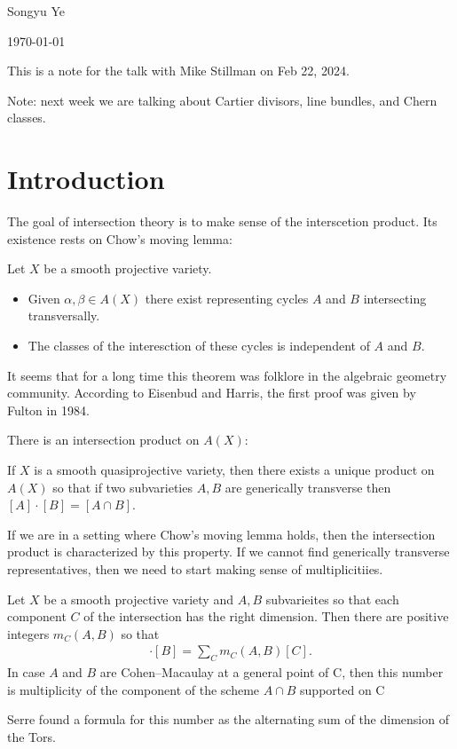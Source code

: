 \documentclass[12pt]{article}
\begin{document}
Songyu Ye

\today

\hfill

This is a note for the talk with Mike Stillman on Feb 22, 2024.

Note: next week we are talking about Cartier divisors, line bundles, and Chern classes.

\section{Introduction}
The goal of intersection theory is to make sense of the interscetion product. Its existence rests on Chow's moving lemma: 

\begin{theorem}
	Let $X$ be a smooth projective variety.
	\begin{itemize}
		\item Given $\alpha,\beta \in A(X)$ there exist representing cycles $A$ and $B$ intersecting transversally.
		\item The classes of the interesction of these cycles is independent of $A$ and $B$.
	\end{itemize}
\end{theorem}
It seems that for a long time this theorem was folklore in the algebraic geometry community. According 
to Eisenbud and Harris, the first proof was given by Fulton in 1984.

\hfill

There is an intersection product on $A(X)$:
\begin{theorem}
    If $X$ is a smooth quasiprojective variety, then there exists a unique product on $A(X)$ so that if two subvarieties 
    $A,B$ are generically transverse then $[A]\cdot [B] = [A\cap B]$.
\end{theorem}
If we are in a setting where Chow's moving lemma holds, then the intersection product is characterized by this property. 
If we cannot find generically transverse representatives, then we need to start making sense of multiplicitiies. 

\begin{theorem}
    Let $X$ be a smooth projective variety and $A,B$ subvarieites so that each component $C$
    of the intersection has the right dimension. Then there are positive integers $m_C(A,B)$ so that
    \begin{align*}
        [A]\cdot [B] = \sum_C m_C(A,B)[C].
    \end{align*}
    In case $A$ and $B$ are Cohen–Macaulay at a general point of C,
    then this number is multiplicity of the component of the scheme $A \cap B$ supported on C
\end{theorem}
Serre found a formula for this number as the alternating sum of the dimension of the Tors.
\end{document}
